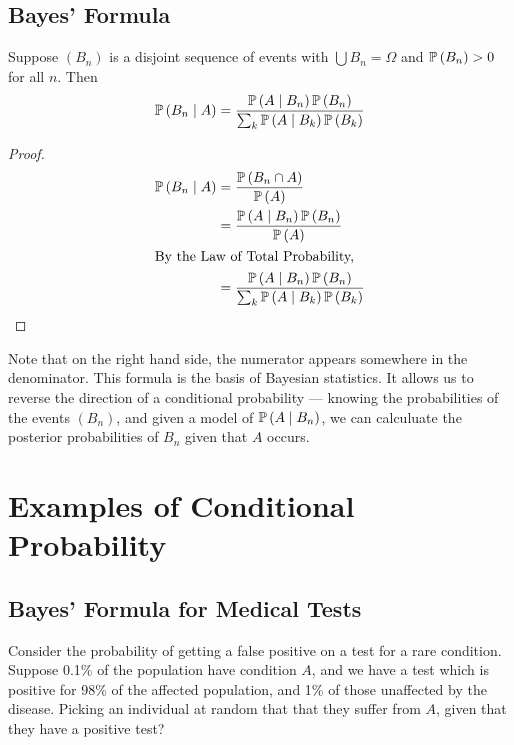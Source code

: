 \documentclass{article}
\begin{document}
\subsection{Bayes' Formula}
\begin{claim}
    Suppose $(B_n)$ is a disjoint sequence of events with $\bigcup B_n = \Omega$ and $\mathbb{P}\left({B_n}\right) > 0$ for all $n$. Then
    \[ \mathbb{P}\left({B_n \mid A}\right) = \frac{\mathbb{P}\left({A \mid B_n}\right) \mathbb{P}\left({B_n}\right)}{\sum_k \mathbb{P}\left({A \mid B_k}\right) \mathbb{P}\left({B_k}\right)} \]
\end{claim}
\begin{proof}
    \begin{align*}
        \mathbb{P}\left({B_n \mid A}\right) & = \frac{\mathbb{P}\left({B_n \cap A}\right)}{\mathbb{P}\left({A}\right)}                                       \\
                          & = \frac{\mathbb{P}\left({A \mid B_n}\right) \mathbb{P}\left({B_n}\right)}{\mathbb{P}\left({A}\right)}                            \\
        \intertext{By the Law of Total Probability,}
                          & = \frac{\mathbb{P}\left({A \mid B_n}\right) \mathbb{P}\left({B_n}\right)}{\sum_k \mathbb{P}\left({A \mid B_k}\right) \mathbb{P}\left({B_k}\right)}
    \end{align*}
\end{proof}
\noindent Note that on the right hand side, the numerator appears somewhere in the denominator. This formula is the basis of Bayesian statistics. It allows us to reverse the direction of a conditional probability --- knowing the probabilities of the events $(B_n)$, and given a model of $\mathbb{P}\left({A \mid B_n}\right)$, we can calculuate the posterior probabilities of $B_n$ given that $A$ occurs.

\section{Examples of Conditional Probability}
\subsection{Bayes' Formula for Medical Tests}
Consider the probability of getting a false positive on a test for a rare condition. Suppose 0.1\% of the population have condition $A$, and we have a test which is positive for 98\% of the affected population, and 1\% of those unaffected by the disease. Picking an individual at random that that they suffer from $A$, given that they have a positive test?
\end{document}

